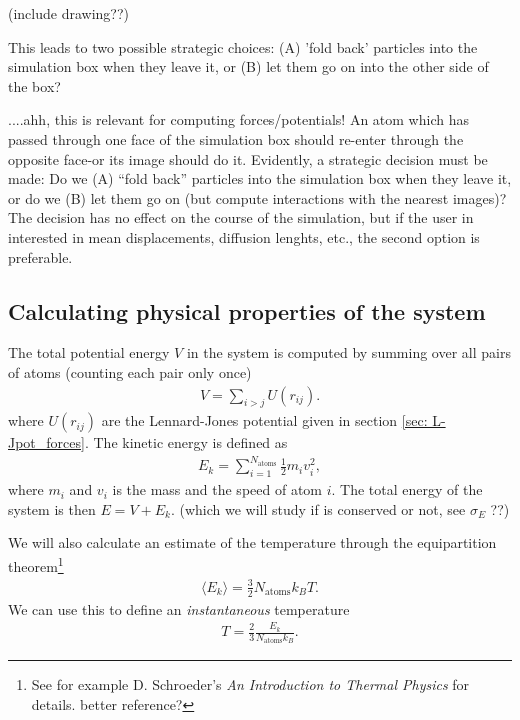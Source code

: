 \documentclass[11pt,a4wide]{article}
\begin{document}
(include drawing??)

This leads to two possible strategic choices: (A) 'fold back' particles into the simulation box when they leave it, or (B) let them go on into the other side of the box?

....ahh, this is relevant for computing forces/potentials!
An atom which has passed through one face of the simulation box should re-enter through the opposite face-or its image should do it. Evidently, a strategic decision must be made: Do we (A) “fold back” particles into the simulation box when they leave it, or do we (B) let them go on (but compute interactions with the nearest images)? The decision has no effect on the course of the simulation, but if the user in interested in mean displacements, diffusion lenghts, etc., the second option is preferable.




  
  
\subsection{Calculating physical properties of the system} \label{sec: statistics_theory}
The total potential energy $V$ in the system is computed by summing over all pairs of atoms (counting each pair only once) 
\begin{align}
	V = \sum_{i>j} U(r_{ij}).
\end{align}
where $U(r_{ij})$ are the Lennard-Jones potential given in section \ref{sec: L-Jpot_forces}. The kinetic energy is defined as
\begin{align}
	E_k = \sum_{i=1}^{N_\text{atoms}} \frac{1}{2} m_i v_i^2,
\end{align}
where $m_i$ and $v_i$ is the mass and the speed of atom $i$. The total energy of the system is then $E = V + E_k$. (which we will study if is conserved or not, see $\sigma_E$ ??)

We will also calculate an estimate of the temperature through the equipartition theorem\footnote{See for example D. Schroeder's \textit{An Introduction to Thermal Physics} for details. better reference?}
\begin{align}
	\langle E_k \rangle = \frac{3}{2}N_\text{atoms} k_B T.
\end{align}
We can use this to define an \textit{instantaneous} temperature
\begin{align}
	\label{eq:temperature}
	T = \frac{2}{3}\frac{E_k}{N_\text{atoms} k_B}.
\end{align}
\end{document}
